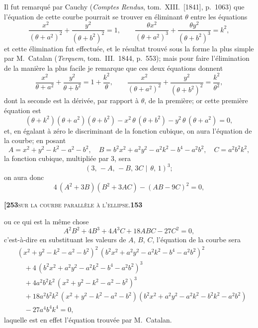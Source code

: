 \documentclass[11pt]{article}
\newcommand{\Cdel}{\mid}
\begin{document}
\medskip

Il fut remarqué par Cauchy (\textit{Comptes Rendus}, tom.~XIII.\ [1841], p.~1063) que l'équation de cette courbe pourrait se trouver en éliminant $\theta$ entre les équations
\[
\frac{x^2}{(\theta + a^2)^2} + \frac{y^2}{(\theta + b^2)^2} = 1,\qquad \frac{\theta x^2}{(\theta + a^2)^3} + \frac{\theta y^2}{(\theta + b^2)^3} = k^2,
\]
et cette élimination fut effectuée, et le résultat trouvé sous la forme la plus simple par M.~Catalan (\textit{Terquem}, tom.~III.\ 1844, p.~553); mais pour faire l'élimination de la manière la plus facile je remarque que ces deux équations donnent
\[
\frac{x^2}{\theta + a^2} + \frac{y^2}{\theta + b^2} = 1 + \frac{k^2}{\theta},\qquad \frac{x^2}{(\theta + a^2)^2} + \frac{y^2}{(\theta + b^2)^2} = \frac{k^2}{\theta^2},
\]
dont la seconde est la dérivée, par rapport à $\theta$, de la première; or cette première équation est
\[
(\theta + k^2)(\theta + a^2)(\theta + b^2) - x^2\,\theta\,(\theta + b^2) - y^2\,\theta\,(\theta + a^2) = 0,
\]
et, en égalant à zéro le discriminant de la fonction cubique, on aura l'équation de la courbe; en posant
\[
A = x^2 + y^2 - k^2 - a^2 - b^2,\quad B = b^2x^2 + a^2y^2 - a^2k^2 - b^4 - a^2b^2,\quad C = a^2b^2k^2,
\]
la fonction cubique, multipliée par 3, sera
\[
(3,\,-A,\,-B,\,3C\!\Cdel\,\theta,\,1)^3;
\]
on aura donc
\[
4\,(A^2 + 3B)(B^2 + 3AC) - (AB - 9C)^2 = 0,
\]

\newpage

\noindent\textbf{[253}\hfill\textsc{sur la courbe parallèle à l'ellipse.}\hfill\textbf{153}

\medskip

\noindent ou ce qui est la même chose
\[
A^2B^2 + 4B^3 + 4A^3C + 18ABC - 27C^2 = 0,
\]
c'est-à-dire en substituant les valeurs de $A$, $B$, $C$, l'équation de la courbe sera
\begin{align*}
&(x^2 + y^2 - k^2 - a^2 - b^2)^2\,(b^2x^2 + a^2y^2 - a^2k^2 - b^4 - a^2b^2)^2\\
&\quad + 4\,(b^2x^2 + a^2y^2 - a^2k^2 - b^4 - a^2b^2)^3\\
&\quad + 4a^2b^2k^2\,(x^2 + y^2 - k^2 - a^2 - b^2)^3\\
&\quad + 18a^2b^2k^2\,(x^2 + y^2 - k^2 - a^2 - b^2)(b^2x^2 + a^2y^2 - a^2k^2 - b^2k^2 - a^2b^2)\\
&\quad - 27a^4b^4k^4 = 0,
\end{align*}
laquelle est en effet l'équation trouvée par M.~Catalan.
\end{document}

